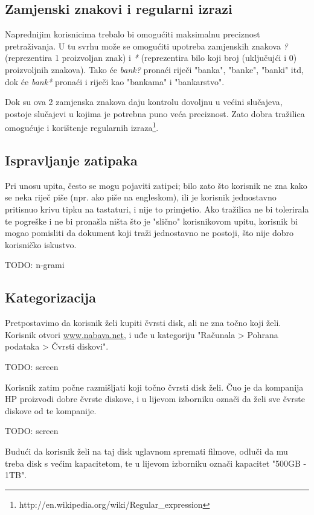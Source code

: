 \documentclass[11pt]{scrreprt}
\begin{document}
\subsection{Zamjenski znakovi i regularni izrazi}

Naprednijim korisnicima trebalo bi omogućiti maksimalnu preciznost pretraživanja. U tu svrhu može se omogućiti upotreba zamjenskih znakova \textit{?} (reprezentira 1 proizvoljan znak) i \textit{*} (reprezentira bilo koji broj (uključujći i 0) proizvoljnih znakova). Tako će \textit{bank?} pronaći riječi "banka", "banke", "banki" itd, dok će \textit{bank*} pronaći i riječi kao "bankama" i "bankarstvo".

Dok su ova 2 zamjenska znakova daju kontrolu dovoljnu u većini slučajeva, postoje slučajevi u kojima je potrebna puno veća preciznost. Zato dobra tražilica omogućuje i korištenje regularnih izraza\footnote{http://en.wikipedia.org/wiki/Regular_expression}.

\subsection{Ispravljanje zatipaka}

Pri unosu upita, često se mogu pojaviti zatipci; bilo zato što korisnik ne zna kako se neka riječ piše (npr. ako piše na engleskom), ili je korisnik jednostavno pritisnuo krivu tipku na tastaturi, i nije to primjetio. Ako tražilica ne bi tolerirala te pogreške i ne bi pronašla ništa što je "slično" korisnikovom upitu, korisnik bi mogao pomisliti da dokument koji traži jednostavno ne postoji, što nije dobro korisničko iskustvo.

TODO: n-grami

\subsection{Kategorizacija}

Pretpostavimo da korisnik želi kupiti čvrsti disk, ali ne zna točno koji želi. Korisnik otvori \url{www.nabava.net}, i uđe u kategoriju "Računala > Pohrana podataka > Čvrsti diskovi".

TODO: screen

Korisnik zatim počne razmišljati koji točno čvrsti disk želi. Čuo je da kompanija HP proizvodi dobre čvrste diskove, i u lijevom izborniku označi da želi sve čvrste diskove od te kompanije.

TODO: screen

Budući da korisnik želi na taj disk uglavnom spremati filmove, odluči da mu treba disk s većim kapacitetom, te u lijevom izborniku označi kapacitet "500GB - 1TB".
\end{document}
